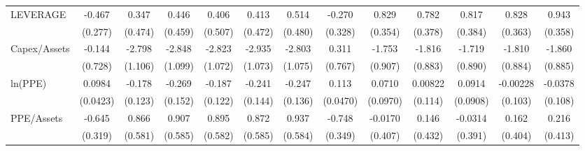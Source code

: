 {\begin{tabular}{l*{12}{c}}
LEVERAGE            &      -0.467\sym{*}  &       0.347         &       0.446         &       0.406         &       0.413         &       0.514         &      -0.270         &       0.829\sym{**} &       0.782\sym{**} &       0.817\sym{**} &       0.828\sym{**} &       0.943\sym{**} \\
                    &     (0.277)         &     (0.474)         &     (0.459)         &     (0.507)         &     (0.472)         &     (0.480)         &     (0.328)         &     (0.354)         &     (0.378)         &     (0.384)         &     (0.363)         &     (0.358)         \\
Capex/Assets        &      -0.144         &      -2.798\sym{**} &      -2.848\sym{**} &      -2.823\sym{**} &      -2.935\sym{***}&      -2.803\sym{**} &       0.311         &      -1.753\sym{*}  &      -1.816\sym{**} &      -1.719\sym{*}  &      -1.810\sym{**} &      -1.860\sym{**} \\
                    &     (0.728)         &     (1.106)         &     (1.099)         &     (1.072)         &     (1.073)         &     (1.075)         &     (0.767)         &     (0.907)         &     (0.883)         &     (0.890)         &     (0.884)         &     (0.885)         \\
ln(PPE)             &      0.0984\sym{**} &      -0.178         &      -0.269\sym{*}  &      -0.187         &      -0.241\sym{*}  &      -0.247\sym{*}  &       0.113\sym{**} &      0.0710         &     0.00822         &      0.0914         &    -0.00228         &     -0.0378         \\
                    &    (0.0423)         &     (0.123)         &     (0.152)         &     (0.122)         &     (0.144)         &     (0.136)         &    (0.0470)         &    (0.0970)         &     (0.114)         &    (0.0908)         &     (0.103)         &     (0.108)         \\
PPE/Assets          &      -0.645\sym{**} &       0.866         &       0.907         &       0.895         &       0.872         &       0.937         &      -0.748\sym{**} &     -0.0170         &       0.146         &     -0.0314         &       0.162         &       0.216         \\
                    &     (0.319)         &     (0.581)         &     (0.585)         &     (0.582)         &     (0.585)         &     (0.584)         &     (0.349)         &     (0.407)         &     (0.432)         &     (0.391)         &     (0.404)         &     (0.413)         \\

\end{tabular}}
